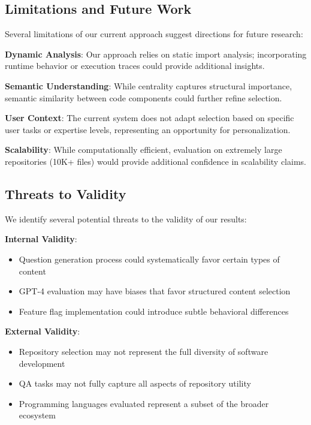 \documentclass[conference]{IEEEtran}
\begin{document}
\subsection{Limitations and Future Work}

Several limitations of our current approach suggest directions for future research:

\textbf{Dynamic Analysis}: Our approach relies on static import analysis; incorporating runtime behavior or execution traces could provide additional insights.

\textbf{Semantic Understanding}: While centrality captures structural importance, semantic similarity between code components could further refine selection.

\textbf{User Context}: The current system does not adapt selection based on specific user tasks or expertise levels, representing an opportunity for personalization.

\textbf{Scalability}: While computationally efficient, evaluation on extremely large repositories (10K+ files) would provide additional confidence in scalability claims.

\subsection{Threats to Validity}

We identify several potential threats to the validity of our results:

\textbf{Internal Validity}: 
\begin{itemize}
\item Question generation process could systematically favor certain types of content
\item GPT-4 evaluation may have biases that favor structured content selection
\item Feature flag implementation could introduce subtle behavioral differences
\end{itemize}

\textbf{External Validity}:
\begin{itemize}
\item Repository selection may not represent the full diversity of software development
\item QA tasks may not fully capture all aspects of repository utility
\item Programming languages evaluated represent a subset of the broader ecosystem
\end{itemize}
\end{document}
